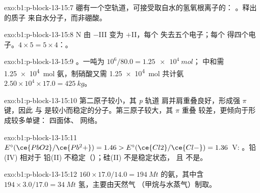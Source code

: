 \begin{solution}{exo:b1:p-block-13-15:7}
硼有一个空轨道，可接受取自水的氢氧根离子的：
。释出的质子
来自水分子，而非硼酸。
\end{solution}

\begin{solution}{exo:b1:p-block-13-15:8}
N 由 $-$III 变为 $+$II，每个  失去五个电子；每个 
得四个电子。$4 \times 5 = 5 \times 4$：。
\end{solution}

\begin{solution}{exo:b1:p-block-13-15:9}
。一吨为 $10^6/80.0 = \qty{1.25e4}{mol}$；
中和需 \qty{1.25e4}{mol} 氨，制硝酸又需 \qty{1.25e4}{mol}
共计氨 $2.50 \times 10^4 \times 17.0 = \qty{425}{kg}$。
\end{solution}

\begin{solution}{exo:b1:p-block-13-15:10}
第二原子较小，其 \textit{p} 轨道
肩并肩重叠良好，形成强 $\pi$ 键，因此  与 
是较小而稳定的分子。第三原子较大，其 $\pi$ 重叠
较差，更倾向于形成较多单键： 四面体、
 网络。
\end{solution}

\begin{solution}{exo:b1:p-block-13-15:11}
$E^\circ(\ce{PbO2}/\ce{Pb^2+}) = 1.46 > E^\circ(\ce{Cl2}/\ce{Cl-}) = 1.36$~V:
。铅(IV) 相对于
铅(II) 不稳定（）；硅(II) 不是稳定状态，
且  不是。
\end{solution}

\begin{solution}{exo:b1:p-block-13-15:12}
$160 \times 17.0/14.0 = \qty{194}{Mt}$ 的氨，其中含 $194 \times
3.0/17.0 = \qty{34}{Mt}$ 氢，主要由天然气
（甲烷与水蒸气）制取。
\end{solution}

